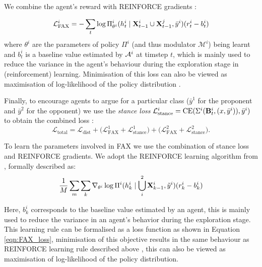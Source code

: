 We combine the agent's reward with REINFORCE gradients%
:

\begin{equation}
\mathcal{L}^i_{\mathrm{FAX}} = -\sum_t \log \Pi^i_{\theta^i}(h^i_t \mid  \mathbf{X}^{i}_{t-1}\cup \mathbf{X}^j_{t-1}, \bar{y}^i) (r^i_t - b^i_t)    
\label{eqn:FAX_loss}
\end{equation}
%
where  $\theta^i$ are the parameters of policy $\Pi^i$ (and thus modulator $\mathcal{M}^i$) being learnt and $b^i_t$ is a baseline value estimated by $\mathcal{ A}^i$ at timstep $t$, which is mainly used to reduce the variance in the agent's behaviour during the exploration stage in (reinforcement) learning.
%
Minimisation of this %
loss can also be viewed as maximisation of log-likelihood of the policy distribution \cite{mnih2014recurrent}.

Finally, to encourage agents to argue for a particular class ($\bar{y}^1$ for the proponent and $\bar{y}^2$ for the opponent) we use
the \emph{stance loss} $\mathcal{L}^i_{\mathrm{stance}} = \mathrm{CE}(\Sigma^i(\mathbf{B}^{i}_t,(x,\bar{y}^i)), \bar{y}^i)$ %
to obtain  the combined loss%
: $$\mathcal{L}_{\mathrm{total}} = \mathcal{L}_{\mathrm{dist}} +  \Big(\mathcal{L}^1_{\mathrm{FAX}} + \mathcal{L}^1_{\mathrm{stance}}\Big) + \Big(\mathcal{L}^2_{\mathrm{FAX}} + \mathcal{L}^2_{\mathrm{stance}}\Big).$$%



\iffalse 
To learn the parameters involved in FAX we use the combination of stance loss and REINFORCE gradients.
We adopt the REINFORCE learning algorithm from \cite{mnih2014recurrent}, formally described as:
\begin{equation}
     \frac{1}{M} \sum_m \sum_k \nabla_{\theta^i} \log \Pi^i(h^i_k \mid \bigcup_i^2 \mathbf{X}^{i}_{k-1}, \tilde{y}^i) (r^i_k - b^i_k)
    \label{eqn:reinforce}
\end{equation}

Here, $b^i_k$ corresponds to the baseline value estimated by an agent, this is mainly used to reduce the variance in an agent's behavior during the exploration stage.
This learning rule can be formalised  as a loss function as shown in Equation \ref{eqn:FAX_loss},  minimisation of this objective results in the same behaviour as REINFORCE learning rule described above \cite{mnih2014recurrent}, this can also be viewed as maximisation of log-likelihood of the policy distribution.

